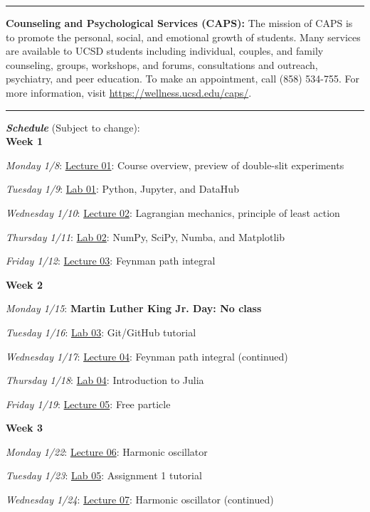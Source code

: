 \documentclass[12pt]{article}
\begin{document}
\begin{center}
  \rule{\textwidth}{0.5pt}
\end{center}

\noindent\textbf{Counseling and Psychological Services (CAPS):} The mission of CAPS is to promote the personal, social, and emotional growth of students.
Many services are available to UCSD students including individual, couples, and family counseling, groups, workshops, and forums, consultations and outreach, psychiatry, and peer education.
To make an appointment, call (858) 534-755.
For more information, visit \href{https://wellness.ucsd.edu/caps/}{https://wellness.ucsd.edu/caps/}.

\begin{center}
  \rule{\textwidth}{0.5pt}
\end{center}

\noindent\textbf{\emph{Schedule}} (Subject to change):\\

\noindent\textbf{Week 1}

\emph{Monday 1/8}: \underline{Lecture 01}: Course overview, preview of double-slit experiments

\emph{Tuesday 1/9}: \underline{Lab 01}: Python, Jupyter, and DataHub

\emph{Wednesday 1/10}: \underline{Lecture 02}: Lagrangian mechanics, principle of least action

\emph{Thursday 1/11}: \underline{Lab 02}: NumPy, SciPy, Numba, and Matplotlib

\emph{Friday 1/12}: \underline{Lecture 03}: Feynman path integral

\noindent\textbf{Week 2}

\emph{Monday 1/15}: \textbf{Martin Luther King Jr. Day: No class}

\emph{Tuesday 1/16}: \underline{Lab 03}: Git/GitHub tutorial

\emph{Wednesday 1/17}: \underline{Lecture 04}: Feynman path integral (continued)

\emph{Thursday 1/18}: \underline{Lab 04}: Introduction to Julia

\emph{Friday 1/19}: \underline{Lecture 05}: Free particle

\noindent\textbf{Week 3}

\emph{Monday 1/22}: \underline{Lecture 06}: Harmonic oscillator

\emph{Tuesday 1/23}: \underline{Lab 05}: Assignment 1 tutorial

\emph{Wednesday 1/24}: \underline{Lecture 07}: Harmonic oscillator (continued)
\end{document}
